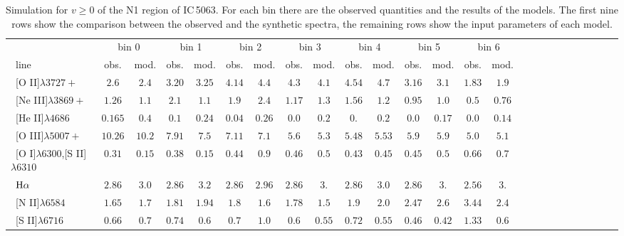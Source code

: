 \documentclass[../thesis.tex]{subfiles}
\begin{document}
\begin{landscape}
\begin{table}

\centering
\caption{Simulation for $v\ge0$ of the N1 region of IC\,5063. For each bin there are the observed quantities and the results of the models. The first nine rows show the comparison between the observed and the synthetic spectra, the remaining rows show the input parameters of each model.}
\label{tab:sim_n1+}


\small{
\begin{tabular}{lcccccccccccccccccccccccc} 
\hline
\ &\multicolumn{2}{c}{bin 0} &\multicolumn{2}{c}{bin 1}&\multicolumn{2}{c}{bin 2}&\multicolumn{2}{c}{bin 3}&\multicolumn{2}{c}{bin 4}&\multicolumn{2}{c}{bin 5}&\multicolumn{2}{c}{bin 6}\\
\   line              &obs.  &mod.  & obs.  &mod.  &obs. &mod.  &obs.  &mod. &obs.  &mod. &obs.   &mod. &obs. &mod. \\ \hline
\ [O II]$\lambda3727+ $         &$2.6   $&$2.4   $&$3.20   $&$ 3.25 $&$4.14 $&$4.4   $&$4.3   $&$4.1  $&$4.54  $&$4.7   $&$3.16  $&$3.1   $&$ 1.83 $&$ 1.9 $ \\
\ [Ne III]$\lambda3869+ $       &$1.26  $&$1.1   $&$2.1    $&$ 1.1  $&$1.9  $&$2.4   $&$1.17  $&$1.3   $&$1.56  $&$1.2   $&$0.95  $&$1.0  $&$ 0.5  $&$ 0.76$ \\
\ [He II]$\lambda4686$           &$0.165 $&$0.4   $&$0.1    $&$ 0.24 $&$0.04 $&$0.26  $&$0.0   $&$0.2   $&$0.    $&$0.2   $&$0.0   $&$0.17 $&$ 0.0  $&$ 0.14 $\\
\ [O III]$\lambda5007+ $        &$10.26 $&$10.2  $&$ 7.91  $&$  7.5 $&$ 7.11$&$ 7.1  $&$ 5.6  $&$ 5.3  $&$  5.48$&$  5.53$&$ 5.9  $&$ 5.9 $&$ 5.0  $&$5.1$ \\
\ [O I]$\lambda6300$,[S II]$\lambda6310$  &$0.31  $&$0.15  $&$0.38   $&$0.15  $&$0.44 $&$0.9   $&$0.46  $&$0.5   $&$0.43  $&$0.45  $&$0.45  $&$0.5  $&$ 0.66 $&$ 0.7 $\\
\ $\rm H\alpha$                 &$2.86  $&$3.0   $&$2.86   $&$ 3.2  $&$2.86 $&$2.96  $&$2.86  $&$3.    $&$2.86  $&$3.0   $&$2.86  $&$3.   $&$ 2.56 $&$ 3. $ \\
\ [N II]$\lambda6584$           &$1.65  $&$1.7   $&$1.81   $&$ 1.94 $&$1.8  $&$1.6   $&$1.78  $&$1.5   $&$1.9   $&$2.0   $&$2.47  $&$2.6  $&$ 3.44 $&$ 2.4 $\\
\ [S II]$\lambda6716$           &$0.66  $&$0.7   $&$0.74   $&$ 0.6  $&$0.7  $&$1.0   $&$0.6   $&$0.55  $&$0.72  $&$0.55  $&$0.46  $&$0.42 $&$ 1.33$&$ 0.6  $\\

\end{tabular}}
\end{table}
\end{landscape}
\end{document}
